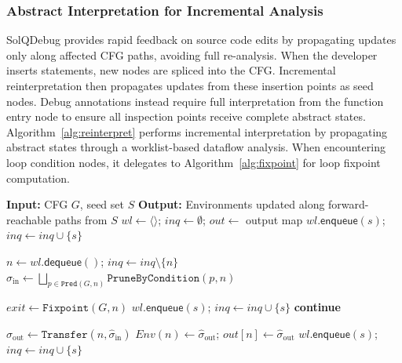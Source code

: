 \documentclass[pdflatex,sn-basic]{sn-jnl}%
\theoremstyle{thmstyleone}%
\theoremstyle{thmstyletwo}%
\theoremstyle{thmstylethree}%
\newcommand{\Env}{\mathit{Env}}
\begin{document}
        \subsubsection{Abstract Interpretation for Incremental Analysis}\label{sec:impl}
SolQDebug provides rapid feedback on source code edits by propagating updates only along affected CFG paths, avoiding full re-analysis.
When the developer inserts statements, new nodes are spliced into the CFG. Incremental reinterpretation then propagates updates from these insertion points as seed nodes.
Debug annotations instead require full interpretation from the function entry node to ensure all inspection points receive complete abstract states.
Algorithm~\ref{alg:reinterpret} performs incremental interpretation by propagating abstract states through a worklist-based dataflow analysis.
When encountering loop condition nodes, it delegates to Algorithm~\ref{alg:fixpoint} for loop fixpoint computation.

\begin{algorithm}[t!]
\caption{Incremental Interpretation}
\label{alg:reinterpret}
\begin{algorithmic}[1]
\State \textbf{Input:} CFG $G$, seed set $S$
\State \textbf{Output:} Environments updated along forward-reachable paths from $S$
  \State $wl\gets\langle\rangle$; \quad $inq\gets\emptyset$; \quad $out\gets$ output map
     \State $wl.\textsf{enqueue}(s)$; \quad $inq\gets inq\cup\{s\}$ \EndIf
  \EndFor

    \State $n \gets wl.\textsf{dequeue}()$; \quad $inq\gets inq\setminus\{n\}$
    \State $\hat{\sigma}_{\mathrm{in}}\gets \bigsqcup_{p\in\texttt{Pred}(G, n)} \texttt{PruneByCondition}(p,n)$

       \State $exit \gets \texttt{Fixpoint}(G, n)$ 
          \State $wl.\textsf{enqueue}(s)$; \quad $inq\gets inq\cup\{s\}$ \EndIf
       \EndFor
       \State \textbf{continue}
    \EndIf

    \State $\hat{\sigma}_{\mathrm{out}}\gets \texttt{Transfer}(n,\hat{\sigma}_{\mathrm{in}})$
       \State $\Env(n)\gets \hat{\sigma}_{\mathrm{out}}$; \quad $out[n]\gets \hat{\sigma}_{\mathrm{out}}$
          \State $wl.\textsf{enqueue}(s)$; \quad $inq\gets inq\cup\{s\}$ \EndIf
       \EndFor
    \EndIf
  \EndWhile
\EndFunction
\end{algorithmic}
\end{algorithm}
\end{document}
